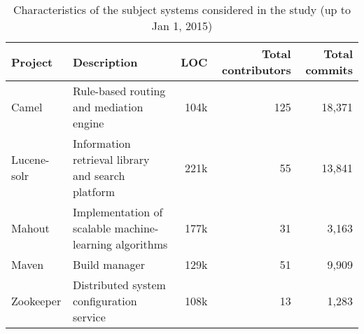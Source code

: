 \begin{table*}[t]
\centering
\caption{Characteristics of the subject systems considered in the study (up to Jan 1, 2015)}
\label{tab:projects}
\begin{tabular}{|l|l|r|r|r|}
\hline
\textbf{Project} & \textbf{Description} & \textbf{LOC} & \textbf{Total contributors} & \textbf{Total commits}\\\hline
\hline
Camel       & Rule-based routing and mediation engine & 104k  & 125 & 18,371 \\\hline
Lucene-solr & Information retrieval library and search platform & 221k & 55 & 13,841 \\\hline
Mahout      & Implementation of scalable machine-learning algorithms & 177k & 31 & 3,163 \\\hline
Maven       & Build manager & 129k & 51 & 9,909 \\\hline
Zookeeper   & Distributed system configuration service & 108k & 13  & 1,283 \\\hline
\end{tabular}
\end{table*}
